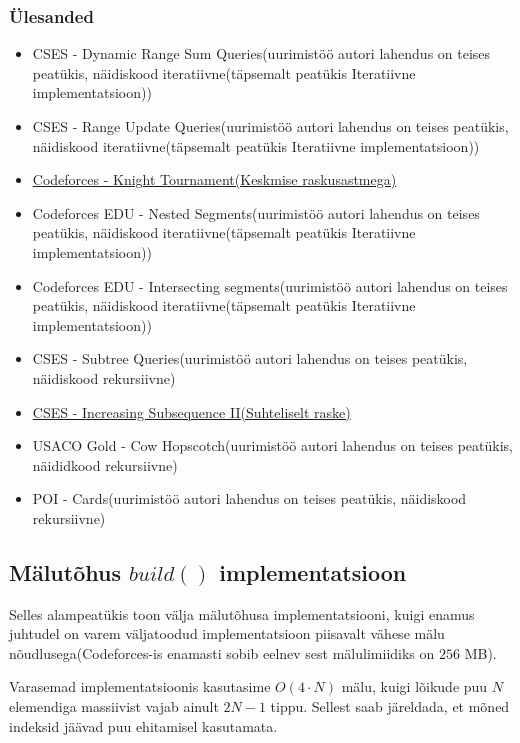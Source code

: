 \documentclass{trkut}
\begin{document}
\subsubsection{Ülesanded}
\begin{itemize}
    \item CSES - Dynamic Range Sum Queries(uurimistöö autori lahendus on teises peatükis, näidiskood iteratiivne(täpsemalt peatükis Iteratiivne implementatsioon))
    \item CSES - Range Update Queries(uurimistöö autori lahendus on teises peatükis, näidiskood iteratiivne(täpsemalt peatükis Iteratiivne implementatsioon))
    \item \href{https://codeforces.com/problemset/problem/356/A}{Codeforces - Knight Tournament(Keskmise raskusastmega)}
    \item Codeforces EDU - Nested Segments(uurimistöö autori lahendus on teises peatükis, näidiskood iteratiivne(täpsemalt peatükis Iteratiivne implementatsioon))
    \item Codeforces EDU - Intersecting segments(uurimistöö autori lahendus on teises peatükis, näidiskood iteratiivne(täpsemalt peatükis Iteratiivne implementatsioon))
    \item CSES - Subtree Queries(uurimistöö autori lahendus on teises peatükis, näidiskood rekursiivne)
    \item \href{https://cses.fi/problemset/task/1748}{CSES - Increasing Subsequence II(Suhteliselt raske)}
    \item USACO Gold - Cow Hopscotch(uurimistöö autori lahendus on teises peatükis, näididkood rekursiivne)
    \item POI - Cards(uurimistöö autori lahendus on teises peatükis, näidiskood rekursiivne)
\end{itemize}
\subsection{Mälutõhus $build()$ implementatsioon}

Selles alampeatükis toon välja mälutõhusa implementatsiooni, kuigi enamus juhtudel on varem väljatoodud implementatsioon piisavalt vähese mälu nõudlusega(Codeforces-is enamasti sobib eelnev sest mälulimiidiks on $256$ MB).

Varasemad implementatsioonis kasutasime $O(4\cdot N)$ mälu, kuigi lõikude puu $N$ elemendiga massiivist vajab ainult $2N-1$ tippu. Sellest saab järeldada, et mõned indeksid jäävad puu ehitamisel kasutamata. \parencite{EMaxx}
\end{document}
